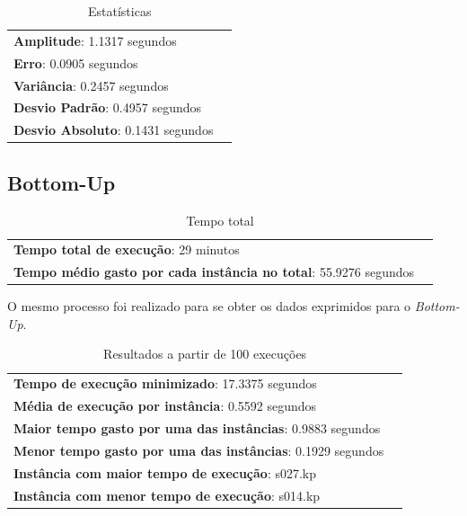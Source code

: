 \documentclass[a4paper, 12pt]{article}
\begin{document}
\vspace{-15pt}

\begin{table}[!htb]
    \begin{tabular}{ll}
        {\bf Amplitude}: 1.1317 segundos\\
        {\bf Erro}: 0.0905 segundos\\
        {\bf Variância}: 0.2457 segundos\\
        {\bf Desvio Padrão}: 0.4957 segundos\\
        {\bf Desvio Absoluto}: 0.1431 segundos
    \end{tabular}
    \caption{Estatísticas}
    \label{tab:estatistica_tot_topdown}
\end{table}
\newpage
\subsection{Bottom-Up}
\begin{table}[!htb]
    \begin{tabular}{ll}
        {\bf Tempo total de execução}: 29 minutos\\
        {\bf Tempo médio gasto por cada instância no total}: 55.9276 segundos
    \end{tabular}
    \caption{Tempo total}
    \label{tab:total_bottomup}
\end{table}
O mesmo processo foi realizado para se obter os dados exprimidos para o {\it Bottom-Up}.
\begin{table}[!htb]
    \begin{tabular}{ll}
        {\bf Tempo de execução minimizado}: 17.3375 segundos\\
        {\bf Média de execução por instância}: 0.5592 segundos\\
        {\bf Maior tempo gasto por uma das instâncias}: 0.9883 segundos\\
        {\bf Menor tempo gasto por uma das instâncias}: 0.1929 segundos \\
        {\bf Instância com maior tempo de execução}: s027.kp\\
        {\bf Instância com menor tempo de execução}: s014.kp
    \end{tabular}
    \caption{Resultados a partir de 100 execuções}
    \label{tab:result_tot_bottomup}
\end{table}
\end{document}
